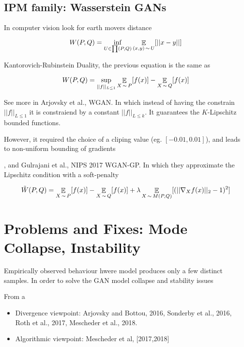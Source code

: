 \subsection{IPM family: Wasserstein GANs}

In computer vision look for earth movers distance

\begin{equation}
  W(P,Q) = \inf_{U\in \prod (P,Q)} \operatorname*{\mathbb{\mathop{E}}}_{(x,y) \operatorname*{\sim} U} [||x-y||]
\end{equation}

Kantorovich-Rubinstein Duality, the previous equation is the same as

\begin{equation}
W(P,Q) = \sup_{||f||_{L \le 1}} \operatorname*{\mathbb{\mathop{E}}}_{X \operatorname*{\sim} P}[f(x)] -
\operatorname*{\mathbb{\mathop{E}}}_{X\operatorname*{\sim} Q} [f(x)]
\end{equation}

See more in Arjovsky et al., WGAN. In which instead of having the constrain
$||f||_{L \le 1}$ it is constraiend by a constant $||f||_{L \le k}$. It guarantees the
$K$-Lipschitz bounded functions.

However, it required the choice of a cliping value (eg. $[-0.01, 0.01]$), and
leads to non-uniform bounding of gradients

, and Gulrajani et al., NIPS 2017 WGAN-GP. In which they approximate the
Lipschitz condition with a soft-penalty

\begin{equation}
  \tilde{W}(P,Q) = \operatorname*{\mathbb{\mathop{E}}}_{X \operatorname*{\sim} P}[f(x)] - \operatorname*{\mathbb{\mathop{E}}}_{X\operatorname*{\sim} Q} [f(x)] +
  \lambda \operatorname*{\mathbb{\mathop{E}}}_{X \operatorname*{\sim} M(P,Q)} [(||\nabla_X f(x) ||_2 -1)^2]
\end{equation}

\section{Problems and Fixes: Mode Collapse, Instability}

Empirically observed behaviour hwere model produces only a few distinct
samples. In order to solve the GAN model collapse and stability issues

From a

\begin{itemize}
  \item Divergence viewpoint: Arjovsky and Bottou, 2016, Sonderby et al., 2016,
    Roth et al., 2017, Mescheder et al., 2018.
  \item Algorithmic viewpoint: Mescheder et al, [2017,2018]
\end{itemize}

